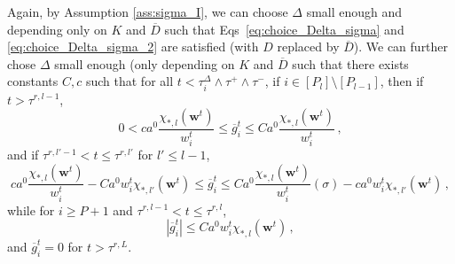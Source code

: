 \documentclass[11pt]{article}
\newcommand{\<}{\langle}
\renewcommand{\>}{\rangle}
\theoremstyle{definition}
\def\bw{{\boldsymbol w}}
\def\bw{{\boldsymbol w}}
\def\og{\overline{g}}
\def\oD{\overline{D}}
\def\oD{\overline{D}}
\begin{document}
Again, by Assumption \ref{ass:sigma_I}, we can choose $\Delta$ small enough and depending only on $K$ and $\oD$ such that Eqs~\eqref{eq:choice_Delta_sigma} and \eqref{eq:choice_Delta_sigma_2} are satisfied (with $D$ replaced by $\oD$). We can further chose $\Delta$ small enough (only depending on $K$ and $\oD$ such that there exists constants $C,c$ such that for all $t < \tau_i^\Delta \wedge \tau^+ \wedge \tau^-$, if $i \in [P_l] \setminus [P_{l-1}]$, then if $t > \tau^{r,l-1}$, 
\[
0 < c a^0 \frac{\chi_{*,l} (\bw^t)}{w_i^t}  \leq \og_i^t \leq C a^0 \frac{\chi_{*,l} (\bw^t)}{w_i^t}  \, ,
\]
and if $\tau^{r,l' - 1} < t \leq \tau^{r,l'}$ for $l' \leq l -1$, 
\[
c a^0 \frac{\chi_{*,l} (\bw^t)}{w_i^t}  - C a^0 w_i^t \chi_{*,l'} (\bw^t) \leq \og_i^t \leq C a^0 \frac{\chi_{*,l} (\bw^t)}{w_i^t} (\sigma) - c a^0 w_i^t \chi_{*,l'} (\bw^t)  \, ,
\]
while for $i \geq P+1$ and $\tau^{r,l - 1} < t \leq \tau^{r,l}$,
\[
| \og_i^t | \leq C a^0 w_i^t \chi_{*,l} (\bw^t) \, ,
\]
and $\og_i^t = 0$ for $t > \tau^{r,L}$.
\end{document}
